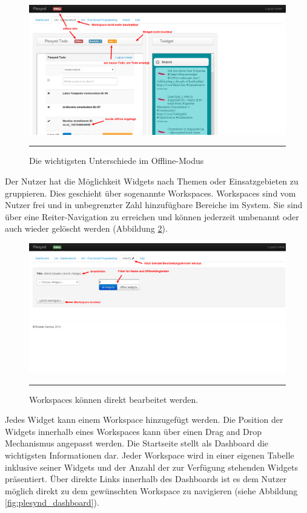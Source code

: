 \begin{figure}
  \centering
  \includegraphics[width=\textwidth,height=\textheight,keepaspectratio]{./Figures/plesynd_workspace_offline.png}
    \rule{35em}{0.5pt}
  \caption[Plesynd User-Interface: Workspace Offline]{Die wichtigsten Unterschiede im Offline-Modus}
  \label{fig:plesynd_workspace_offline}
\end{figure}
Der Nutzer hat die Möglichkeit Widgets nach Themen oder Einsatzgebieten zu gruppieren. Dies geschieht über sogenannte Workspaces. Workspaces sind vom Nutzer frei und in unbegrenzter Zahl hinzufügbare Bereiche im System. Sie sind über eine Reiter-Navigation zu erreichen und können jederzeit umbenannt oder auch wieder gelöscht werden (Abbildung \ref{fig:plesynd_workspace_edit}). 
\begin{figure}
  \centering
  \includegraphics[width=\textwidth,height=\textheight,keepaspectratio]{./Figures/plesynd_workspace_edit.png}
    \rule{35em}{0.5pt}
  \caption[Plesynd User-Interface: Bearbeiten von Workspaces]{Workspaces können direkt bearbeitet werden.}
  \label{fig:plesynd_workspace_edit}
\end{figure}
Jedes Widget kann einem Workspace hinzugefügt werden. Die Position der Widgets innerhalb eines Workspaces kann über einen Drag and Drop Mechanismus angepasst werden. Die Startseite stellt als Dashboard die wichtigsten Informationen dar. Jeder Workspace wird in einer eigenen Tabelle inklusive seiner Widgets und der Anzahl der zur Verfügung stehenden Widgets präsentiert. Über direkte Links innerhalb des Dashboards ist es dem Nutzer möglich direkt zu dem gewünschten Workspace zu navigieren (siehe Abbildung \ref{fig:plesynd_dashboard}).
